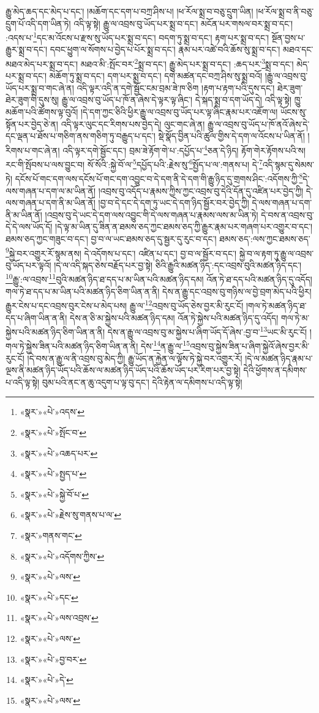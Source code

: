 རྒྱུ་མེད་ཆད་དང་མེད་པ་དང་། །མཆོག་དང་དག་པ་བཀྲ་ཤིས་པ། །ཕ་རོལ་སྨྲ་བ་བཅུ་དྲུག་ཡིན། །ཕ་རོལ་སྨྲ་བ་ནི་བཅུ་དྲུག་པོ་འདི་དག་ཡིན་ཏེ། འདི་ལྟ་སྟེ། རྒྱུ་ལ་འབྲས་བུ་ཡོད་པར་སྨྲ་བ་དང་། མངོན་པར་གསལ་བར་སྨྲ་བ་དང་། :འདས་པ་\footnote{«སྣར་»«པེ་»འདས་}དང་མ་འོངས་པ་རྫས་སུ་ཡོད་པར་སྨྲ་བ་དང་། བདག་ཏུ་སྨྲ་བ་དང་། རྟག་པར་སྨྲ་བ་དང་། སྔོན་བྱས་པ་རྒྱུར་སྨྲ་བ་དང་། དབང་ཕྱུག་ལ་སོགས་པ་བྱེད་པ་པོར་སྨྲ་བ་དང་། རྣམ་པར་འཚེ་བའི་ཆོས་སུ་སྨྲ་བ་དང་། མཐའ་དང་མཐའ་མེད་པར་སྨྲ་བ་དང་། མཐའ་མི་:སྤོང་བར་\footnote{«སྣར་»«པེ་»སྤོང་བ་}སྨྲ་བ་དང་། རྒྱུ་མེད་པར་སྨྲ་བ་དང་། :ཆད་པར་\footnote{«སྣར་»«པེ་»འཆད་པར་}སྨྲ་བ་དང་། མེད་པར་སྨྲ་བ་དང་། མཆོག་ཏུ་སྨྲ་བ་དང་། དག་པར་སྨྲ་བ་དང་། དགེ་མཚན་དང་བཀྲ་ཤིས་སུ་སྨྲ་བའོ། །རྒྱུ་ལ་འབྲས་བུ་ཡོད་པར་སྨྲ་བ་གང་ཞེ་ན། འདི་ལྟར་འདི་ན་དགེ་སྦྱོང་ངམ་བྲམ་ཟེ་ཁ་ཅིག །རྟག་པ་རྟག་པའི་དུས་དང་། ཐེར་ཟུག་ཐེར་ཟུག་གི་དུས་སུ། རྒྱུ་ལ་འབྲས་བུ་ཡོད་པ་ཁོ་ན་ཞེས་དེ་ལྟར་ལྟ་ཞིང་། དེ་སྐད་སྨྲ་བ་དག་ཡོད་དེ། འདི་ལྟ་སྟེ། ཁྱུ་མཆོག་པའི་ཚོགས་ལྟ་བུའོ། །དེ་དག་ཀྱང་ཅིའི་ཕྱིར་རྒྱུ་ལ་འབྲས་བུ་ཡོད་པར་ལྟ་ཞིང་རྣམ་པར་འཇོག་ལ། ཡོངས་སུ་སྟོན་པར་བྱེད་ཅེ་ན། འདི་ལྟར་ལུང་དང་རིགས་པས་བྱེད་དེ། ལུང་གང་ཞེ་ན། རྒྱུ་ལ་འབྲས་བུ་ཡོད་པ་ཁོ་ནའོ་ཞེས་དེ་དང་ལྡན་པ་ཐོས་པ་གཅིག་ནས་གཅིག་ཏུ་བརྒྱུད་པ་དང་། སྡེ་སྣོད་བྱིན་པའི་ཚུལ་གྱིས་དེ་དག་ལ་འོངས་པ་ཡིན་ནོ། །རིགས་པ་གང་ཞེ་ན། འདི་ལྟར་དགེ་སྦྱོང་དང་། བྲམ་ཟེ་རྟོག་གེ་པ་:དཔྱོད་པ་\footnote{«སྣར་»«པེ་»སྤྱད་པ་}ཅན་དེ་ཉིད། རྟོག་གེར་རྟོགས་པའི་ས། རང་གི་སྤོབས་པ་ལས་བྱུང་བ། སོ་སོའི་:སྐྱེ་བོ་ལ་\footnote{«སྣར་»«པེ་»སྐྱེ་བོ་པ་}དཔྱོད་པའི་:རྗེས་སུ་\footnote{«སྣར་»«པེ་»རྗེས་སུ་གནས་པ་ལ་}སྤྱོད་པ་ལ་:གནས་པ། དེ་\footnote{«སྣར་»གནས་གང་}འདི་སྙམ་དུ་སེམས་ཏེ། དངོས་པོ་གང་དག་ལས་དངོས་པོ་གང་དག་འབྱུང་བ་དེ་དག་ནི་དེ་དག་གི་རྒྱུ་ཉིད་དུ་གྲགས་ཤིང་:འདོགས་ཀྱི་\footnote{«སྣར་»«པེ་»འདོགས་ཀྱིས་}དེ་ལས་གཞན་པ་དག་ལ་མ་ཡིན་ནོ། །འབྲས་བུ་འདོད་པ་རྣམས་ཀྱིས་ཀྱང་འབྲས་བུ་དེའི་དོན་དུ་འཛིན་པར་བྱེད་ཀྱི། དེ་ལས་གཞན་པ་དག་ནི་མ་ཡིན་ནོ། །བྱ་བ་དེ་དང་དེ་དག་ཏུ་ཡང་དེ་དག་ཉིད་སྦྱོར་བར་བྱེད་ཀྱི། དེ་ལས་གཞན་པ་དག་ནི་མ་ཡིན་ནོ། །འབྲས་བུ་དེ་ཡང་དེ་དག་ལས་འབྱུང་གི་དེ་ལས་གཞན་པ་རྣམས་ལས་མ་ཡིན་ཏེ། དེ་བས་ན་འབྲས་བུ་དེ་དེ་ལས་ཡོད་དོ། །དེ་ལྟ་མ་ཡིན་དུ་ཟིན་ན་ཐམས་ཅད་ཀྱང་ཐམས་ཅད་ཀྱི་རྒྱུར་རྣམ་པར་གཞག་པར་འགྱུར་བ་དང་། ཐམས་ཅད་ཀྱང་གཟུང་བ་དང་། བྱ་བ་ལ་ཡང་ཐམས་ཅད་དུ་སྦྱར་དུ་རུང་བ་དང་། ཐམས་ཅད་:ལས་ཀྱང་ཐམས་ཅད་\footnote{«སྣར་»«པེ་»ལས་}སྐྱེ་བར་འགྱུར་རོ་སྙམ་ནས། དེ་འདོགས་པ་དང་། འཛིན་པ་དང་། བྱ་བ་ལ་སྦྱོར་བ་དང་། སྐྱེ་བ་ལ་རྟག་ཏུ་རྒྱུ་ལ་འབྲས་བུ་ཡོད་པར་ལྟའོ། །དེ་ལ་འདི་སྐད་ཅེས་བརྗོད་པར་བྱ་སྟེ། ཅིའི་རྒྱུའི་མཚན་ཉིད་:དང་འབྲས་བུའི་མཚན་ཉིད་དང་། \footnote{«སྣར་»«པེ་»དང་}རྒྱུ་:ལ་འབྲས་\footnote{«སྣར་»«པེ་»ལས་འབྲས་}བུའི་མཚན་ཉིད་ཐ་དད་པ་མ་ཡིན་པའི་མཚན་ཉིད་དམ། འོན་ཏེ་ཐ་དད་པའི་མཚན་ཉིད་དུ་འདོད། གལ་ཏེ་ཐ་དད་པ་མ་ཡིན་པའི་མཚན་ཉིད་ཅིག་ཡིན་ན་ནི། དེས་ན་རྒྱུ་དང་འབྲས་བུ་གཉིས་ལ་བྱེ་བྲག་མེད་པའི་ཕྱིར། རྒྱུར་ངེས་པ་དང་འབྲས་བུར་ངེས་པ་མེད་པས། རྒྱུ་ལ་\footnote{«སྣར་»«པེ་»ལས་}འབྲས་བུ་ཡོད་ཅེས་བྱར་མི་རུང་ངོ། །གལ་ཏེ་མཚན་ཉིད་ཐ་དད་པ་ཞིག་ཡིན་ན་ནི། དེས་ན་ཅི་མ་སྐྱེས་པའི་མཚན་ཉིད་དམ། འོན་ཏེ་སྐྱེས་པའི་མཚན་ཉིད་དུ་འདོད། གལ་ཏེ་མ་སྐྱེས་པའི་མཚན་ཉིད་ཅིག་ཡིན་ན་ནི། དེས་ན་རྒྱུ་ལ་འབྲས་བུ་མ་སྐྱེས་པ་ཞིག་ཡོད་དོ་ཞེས་:བྱ་བ་\footnote{«སྣར་»«པེ་»བྱ་བར་}ཡང་མི་རུང་ངོ། །གལ་ཏེ་སྐྱེས་ཟིན་པའི་མཚན་ཉིད་ཅིག་ཡིན་ན་ནི། དེས་\footnote{«སྣར་»«པེ་»དེ་}ན་རྒྱུ་ལ་\footnote{«སྣར་»«པེ་»ལས་}འབྲས་བུ་སྐྱེས་ཟིན་པ་ཞིག་སྐྱེའོ་ཞེས་བྱར་མི་རུང་ངོ། །དེ་བས་ན་རྒྱུ་ལ་ནི་འབྲས་བུ་མེད་ཀྱི། རྒྱུ་ཡོད་ན་རྐྱེན་ལ་ལྟོས་ཏེ་སྐྱེ་བར་འགྱུར་རོ། །དེ་ལ་མཚན་ཉིད་རྣམ་པ་ལྔས་ནི་མཚན་ཉིད་ཡོད་པའི་ཆོས་ལ་མཚན་ཉིད་ཡོད་པའི་ཆོས་ཡོད་པར་རིག་པར་བྱ་སྟེ། དེའི་ཕྱོགས་ན་དམིགས་པ་འདི་ལྟ་སྟེ། བུམ་པའི་ནང་ན་ཆུ་འདུག་པ་ལྟ་བུ་དང་། དེའི་རྟེན་ལ་དམིགས་པ་འདི་ལྟ་སྟེ། 